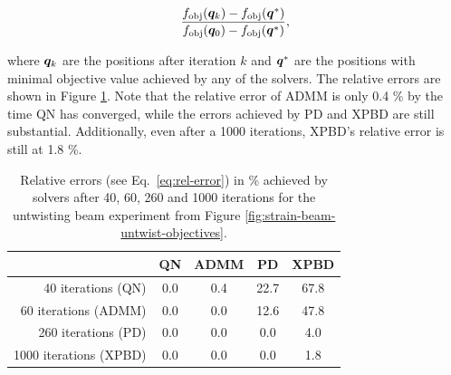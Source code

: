 \begin{equation}\label{eq:rel-error}
    \frac{f_{\text{obj}}(\bm{q}_k) - f_{\text{obj}}(\bm{q}^*)}{f_{\text{obj}}(\bm{q}_0) - f_{\text{obj}}(\bm{q}^*)},
\end{equation}

\noindent where $\bm{q}_k$ are the positions after iteration $k$ and $\bm{q}^*$ are the positions with minimal objective value
achieved by any of the solvers. The relative errors are shown in Figure \ref{fig:rel-errors}. Note that the relative error of ADMM is only 
0.4 \% by the time QN has converged, while the errors achieved by PD and XPBD are still substantial. Additionally, even after a 1000 iterations, XPBD's relative error 
is still at 1.8 \%.

\begin{table}[h]
\centering
\begin{tabular}{ |r||c|c|c|c| } 
 \hline
 & QN & ADMM & PD & XPBD\\
 \hline
 \hline
    40 iterations (QN) & 0.0 & 0.4 & 22.7 & 67.8 \\ 
    60 iterations (ADMM) & 0.0 & 0.0 & 12.6 & 47.8 \\
    260 iterations (PD) & 0.0 & 0.0 & 0.0 & 4.0 \\
    1000 iterations (XPBD) & 0.0 & 0.0 & 0.0 & 1.8 \\ 
 \hline
\end{tabular}
\caption{Relative errors (see Eq.\ \ref{eq:rel-error}) in \% achieved by solvers after 40, 60, 260 and 1000 iterations for the untwisting beam experiment from 
Figure \ref{fig:strain-beam-untwist-objectives}.}
\label{fig:rel-errors}
\end{table}

